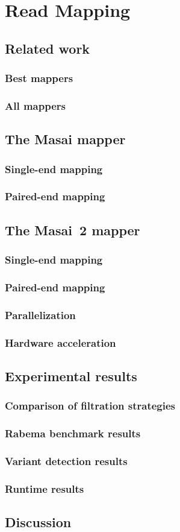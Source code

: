 \chapter{Read Mapping}
\section{Related work}
\subsection{Best mappers}
\subsection{All mappers}
\section{The Masai mapper}
\subsection{Single-end mapping}
\subsection{Paired-end mapping}
\section{The Masai~2 mapper}
\subsection{Single-end mapping}
\subsection{Paired-end mapping}
\subsection{Parallelization}
\subsection{Hardware acceleration}
\section{Experimental results}
\subsection{Comparison of filtration strategies}
\subsection{Rabema benchmark results}
\subsection{Variant detection results}
\subsection{Runtime results}
\section{Discussion}